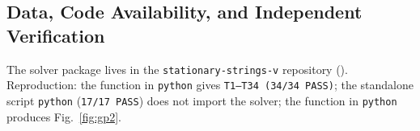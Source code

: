 \documentclass[reprint,aps,pre,twocolumn,notitlepage]{revtex4-2}
\begin{document}
\subsection*{Data, Code Availability, and Independent Verification}
The solver package lives in the \texttt{stationary-strings-v} repository
(). Reproduction:
the  function in \texttt{python} 
gives \texttt{T1--T34 (34/34 PASS)}; the standalone script
\texttt{python}  (\texttt{17/17 PASS}) does not import
the solver; the  function in \texttt{python}
 produces Fig.~\ref{fig:gp2}.



\makeatletter\label{LastBibItem}\makeatother
\end{document}
